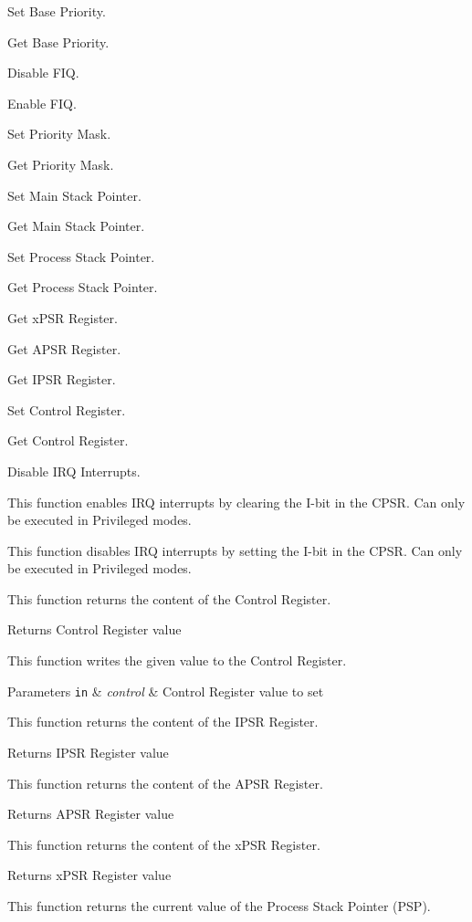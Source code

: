 Set Base Priority.

Get Base Priority.

Disable F\-I\-Q.

Enable F\-I\-Q.

Set Priority Mask.

Get Priority Mask.

Set Main Stack Pointer.

Get Main Stack Pointer.

Set Process Stack Pointer.

Get Process Stack Pointer.

Get x\-P\-S\-R Register.

Get A\-P\-S\-R Register.

Get I\-P\-S\-R Register.

Set Control Register.

Get Control Register.

Disable I\-R\-Q Interrupts.

This function enables I\-R\-Q interrupts by clearing the I-\/bit in the C\-P\-S\-R. Can only be executed in Privileged modes.

This function disables I\-R\-Q interrupts by setting the I-\/bit in the C\-P\-S\-R. Can only be executed in Privileged modes.

This function returns the content of the Control Register.

\begin{DoxyReturn}{Returns}
Control Register value
\end{DoxyReturn}
This function writes the given value to the Control Register.


\begin{DoxyParams}[1]{Parameters}
\mbox{\tt in}  & {\em control} & Control Register value to set\\
\hline
\end{DoxyParams}
This function returns the content of the I\-P\-S\-R Register.

\begin{DoxyReturn}{Returns}
I\-P\-S\-R Register value
\end{DoxyReturn}
This function returns the content of the A\-P\-S\-R Register.

\begin{DoxyReturn}{Returns}
A\-P\-S\-R Register value
\end{DoxyReturn}
This function returns the content of the x\-P\-S\-R Register.

\begin{DoxyReturn}{Returns}
x\-P\-S\-R Register value
\end{DoxyReturn}
This function returns the current value of the Process Stack Pointer (P\-S\-P).

